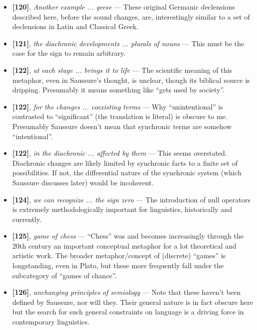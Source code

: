 \documentclass[12pt]{article}
\begin{document}
\begin{itemize}
\item \textbf{[120]}, \textit{Another example ... geese} --- These original Germanic declensions described here, before the sound changes, are, interestingly similar to a set of declensions in Latin and Classical Greek.

\item \textbf{[121]}, \textit{the diachronic developments ... plurals of nouns} --- This must be the case for the sign to remain arbitrary.

\item \textbf{[122]}, \textit{at each stage ... brings it to life} --- The scientific meaning of this metaphor, even in Saussure's thought, is unclear, though its biblical source is dripping. Presumably it means something like ``gets used by society''.

\item \textbf{[122]}, \textit{for the changes ... coexisting terms} --- Why ``unintentional'' is contrasted to ``significant'' (the translation is literal) is obscure to me. Presumably Saussure doesn't mean that synchronic terms are somehow ``intentional''.

\item \textbf{[122]}, \textit{in the diachronic ... affected by them} --- This seems overstated. Diachronic changes are likely limited by synchronic facts to a finite set of possibilities. If not, the differential nature of the synchronic system (which Saussure discusses later) would be incoherent.

\item \textbf{[124]}, \textit{we can recognize ... the sign zero} --- The introduction of null operators is extremely methodologically important for linguistics, historically and currently.

\item \textbf{[125]}, \textit{game of chess} --- ``Chess'' was and becomes increasingly through the 20th century an important conceptual metaphor for a lot theoretical and artistic work. The broader metaphor/concept of (discrete) ``games'' is longstanding, even in Plato, but these more frequently fall under the subcategory of ``games of chance''.

\item \textbf{[126]}, \textit{unchanging principles of semiology} --- Note that these haven't been defined by Saussure, nor will they. Their general nature is in fact obscure here but the search for such general constraints on language is a driving force in contemporary linguistics.


\end{itemize}
\end{document}
